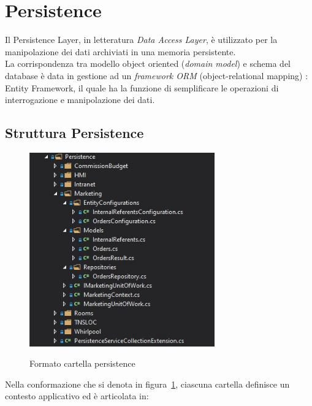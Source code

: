 \section{Persistence}
\label{chap:persistence}
Il Persistence Layer, in letteratura \textit{Data Access Layer}, è utilizzato per la manipolazione dei dati archiviati in una memoria persistente.\\
La corrispondenza tra modello object oriented (\textit{domain model}) e schema del database è data in gestione ad un \textit{framework ORM} (object-relational mapping) \cite{EF}: Entity Framework, il quale ha la funzione di semplificare le operazioni di interrogazione e manipolazione dei dati.

\subsection{Struttura Persistence}
\begin{figure}[h!]
\begin{center}
  \includegraphics[width=8cm]{images/Persistence.jpg}\\
  \caption{Formato cartella persistence}\label{fig:persistence}
\end{center}
\end{figure}

Nella conformazione che si denota in figura~\ref{fig:persistence}, ciascuna cartella definisce un contesto applicativo ed è articolata in:

